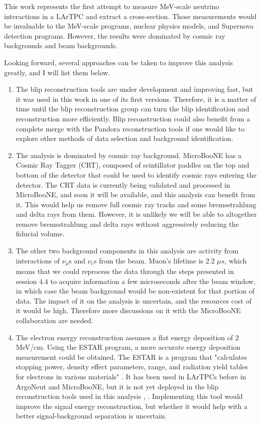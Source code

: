 
This work represents the first attempt to measure MeV-scale neutrino interactions in a LArTPC and extract a cross-section. Those measurements would be invaluable to the MeV-scale programs, nuclear physics models, and Supernova detection programs. 
However, the results were dominated by cosmic ray backgrounds and beam backgrounds. 

Looking  forward, several approaches can be taken to improve this analysis greatly, and I will list them below. 
\begin{enumerate}
\item The blip reconstruction tools are under development and improving fast, but it was used in this work in one of its first versions. Therefore, it is a matter of time until the blip reconstruction group can turn the blip identification and reconstruction more efficiently. Blip reconstruction could also benefit from a complete merge with the Pandora reconstruction tools if one would like to explore other methods of data selection and background identification.

\item The analysis is dominated by cosmic ray background. MicroBooNE has a Cosmic Ray Tagger (CRT), composed of scintillator paddles on the top and bottom of the detector that could be used to identify cosmic rays entering the detector. The CRT data is currently being validated and processed in MicroBooNE, and soon it will be available, and this analysis can benefit from it. This would help us remove full cosmic ray tracks and some bremsstrahlung and delta rays from them. However, it is unlikely we will be able to altogether remove bremsstrahlung and delta rays without aggressively reducing the fiducial volume.
 
\item The other two background components in this analysis are activity from interactions of $\nu_{\mu}$s and $\nu_{e}$s from the beam. Muon's lifetime is $2.2$ $\mu s$, which means that we could reprocess the data through the steps presented in session $4.4$ to acquire information a few microseconds after the beam window, in which case the beam background would be non-existent for that portion of data. The impact of it on the analysis is uncertain, and the resources cost of it would be high. Therefore more discussions on it with the MicroBooNE collaboration are needed. 
 
\item The electron energy reconstruction assumes a flat energy deposition of $2$ MeV/cm. Using the ESTAR program, a more accurate energy deposition measurement could be obtained. The ESTAR is a program that "calculates stopping power, density effect parameters, range, and radiation yield tables for electrons in various materials" \cite{ESTAR}. It has been used in LArTPCs before in ArgoNeut and MicroBooNE, but it is not yet deployed in the blip reconstruction tools used in this analysis \cite{argoneut_mev}, \cite{microboone_mev}. Implementing this tool would improve the signal energy reconstruction, but whether it would help with a better signal-background separation is uncertain. 
 

\end{enumerate}
